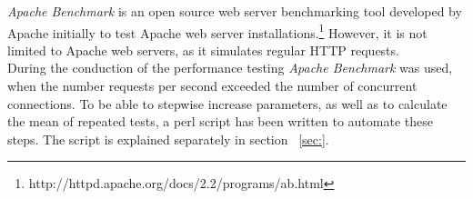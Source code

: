 \emph{Apache Benchmark} is an open source web server benchmarking tool developed by Apache initially to test Apache web server installations.\footnote{http://httpd.apache.org/docs/2.2/programs/ab.html} However, it is not limited to Apache web servers, as it simulates regular HTTP requests.\\
During the conduction of the performance testing \emph{Apache Benchmark} was used, when the number requests per second exceeded the number of concurrent connections. To be able to stepwise increase parameters, as well as to calculate the mean of repeated tests, a perl script has been written to automate these steps. The script is explained separately in section {\color{red}{(PLEASE ADD REFERENCE)}}~\ref{sec:}. 

